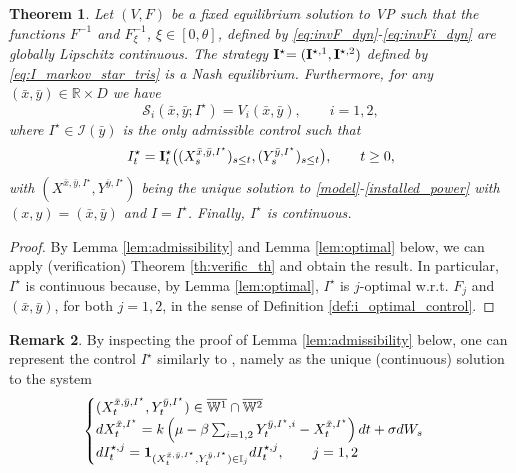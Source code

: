 \documentclass[10pt]{article}
\numberwithin{equation}{section}
\theoremstyle{plain}
\newtheorem{theorem}{Theorem}
\numberwithin{theorem}{section}
\theoremstyle{definition}
\newtheorem{remark}[theorem]{Remark}
\def \b {{\beta}}
\def \R {\mathbb{R}}
\newcommand{\<}{\langle}
\renewcommand{\>}{\rangle}
\renewcommand{\(}{\left(}
\renewcommand{\)}{\right)}
\newcommand\contr{{\bf I}}
\def \R  {{\mathbb {R}}}
\def \b {{\beta}}
\def \R {{\mathbb {R}}}
\def\cS{{\mathcal S}}
\begin{document}
{{{\begin{theorem}\label{th_equilibrium}
Let $(V,F)$ be a fixed equilibrium solution to VP {such that the functions ${F}^{-1}$ and ${F}^{-1}_{\xi}$, $\xi\in[0,\theta]$, defined by \eqref{eq:invF_dyn}-\eqref{eq:invFi_dyn} are globally Lipschitz continuous.} 
The strategy $\contr^{\star}{=(\contr^{\star,1},\contr^{\star,2})}$ defined by \eqref{eq:I_markov_star_tris} is a Nash equilibrium. Furthermore, for any $(\bar x , \bar y)\in \R\times D$ we have 
\begin{equation}\label{eq:nash_cond_th_bis}
\cS_i(\bar x,\bar y; I^{\star}) = V_i(\bar x,\bar y) , \qquad   i = 1,2,
\end{equation}
where $I^{\star}\in\mathcal{I}(\bar y)$ is the only admissible control such that 
\begin{equation}\label{eq:I_markov_star_bis}
I^{\star}_t = \contr_t^{\star}\big((X^{\bar x,\bar y,I^{\star}}_s)_{s\leq t}, (Y^{\bar y,I^{\star}}_{s})_{s\leq t}\big), \qquad t\geq 0,
\end{equation}
with $(X^{\bar x,\bar y,I^{\star}}, Y^{\bar y,I^{\star}})$ being the unique solution to \eqref{model}-\eqref{installed_power} with $(x,y) = (\bar x , \bar y)$ and $I = I^{\star}$. Finally, $I^{\star}$ is continuous.
\end{theorem}
\begin{proof} By Lemma \ref{lem:admissibility} and Lemma \ref{lem:optimal} below, we can apply (verification) Theorem \ref{th:verific_th} and obtain the result. In particular, $I^{\star}$ is continuous because, by Lemma \ref{lem:optimal}, $I^{\star}$ is $j$-optimal w.r.t. $F_j$ and $(\bar{x},\bar{y})$, for both $j=1,2$, in the sense of Definition \ref{def:i_optimal_control}.
\end{proof}
\begin{remark}
By inspecting the proof of Lemma \ref{lem:admissibility} below, one can represent the control $I^{\star}$ similarly to \cite{MR4305783}, namely as the unique (continuous) solution to the system
\begin{equation}\label{eq:optimal_cont}
\begin{cases}
(X^{\bar x,\bar y,I^{\star}}_t,Y^{\bar y,I^{\star}}_t) \in \overline{\mathbb{W}^1} \cap \overline{\mathbb{W}^2}\\
dX^{\bar x, I^{\star}}_t=k\left(\mu-\b \sum_{i=1,2}Y_{t}^{\bar y,I^{\star},i}-X^{\bar x,I^{\star}}_t\right)dt+\sigma dW_s \\
dI^{\star,j}_t = {\bf 1}_{(X^{\bar x,\bar y,I^{\star}}_t,Y^{\bar y,I^{\star}}_t) \in \mathbb{I}_j} dI^{\star,j}_t, \qquad j=1,2 \\

\end{cases}
\end{equation}
\end{remark}}}}
\end{document}
